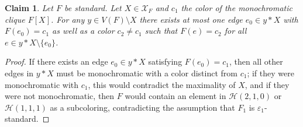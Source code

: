 \documentclass[a4paper,11pt]{article}
\newtheorem{claim}[theorem]{Claim}
\numberwithin{equation}{section}
\newcommand{\mX}{\mathcal{X}}
\newcommand{\mH}{\mathcal{H}}
\begin{document}
\begin{claim} \label{lem:Claim_2} Let $F$ be standard. Let $X \in \mX_F$ and $c_1$ the color of the monochromatic clique $F[X]$. For any
$y \in V(F)\setminus X$
there exists at most one edge $e_0 \in y \ast X$ with $F(e_0) = c_1$ as well as a color $c_2 \neq c_1$ such that $F(e) = c_2$ for all $e \in y \ast X \setminus \{e_0\}$.
\end{claim}
\begin{proof}
    If there exists an edge $e_0 \in y \ast X$ satisfying $F(e_0) = c_1$, then all other edges in $y \ast X$ must be monochromatic with a color distinct from $c_1$; if they were monochromatic with $c_1$, this would contradict the maximality of $X$, and if they were not monochromatic, then $F$ would contain an element in $\mH(2,1,0)$ or $\mH(1,1,1)$ as a subcoloring, contradicting the assumption that $F_1$ is $\varepsilon_1$-standard.
    

\end{proof}
\end{document}

